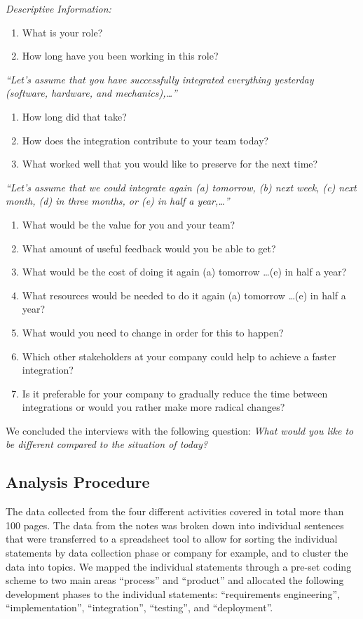 \documentclass[10pt,a4paper]{IEEEtran} %
\begin{document}
\textit{Descriptive Information:}
\begin{enumerate}
\item What is your role?
\item How long have you been working in this role?
\end{enumerate}

\textit{``Let’s assume that you have successfully integrated everything yesterday (software, hardware, and mechanics),\dots''}
\begin{enumerate}
\item How long did that take?
\item How does the integration contribute to your team today?
\item What worked well that you would like to preserve for the next time?
\end{enumerate}

\textit{``Let’s assume that we could integrate again (a) tomorrow, (b) next week, (c) next month, (d) in three months, or (e) in half a year,\dots''}
\begin{enumerate}
\item What would be the value for you and your team?
\item What amount of useful feedback would you be able to get?
\item What would be the cost of doing it again (a) tomorrow \dots (e) in half a year?
\item What resources would be needed to do it again (a) tomorrow \dots (e) in half a year?
\item What would you need to change in order for this to happen?
\item Which other stakeholders at your company could help to achieve a faster integration?
\item Is it preferable for your company to gradually reduce the time between integrations or would you rather make more radical changes?
\end{enumerate}

We concluded the interviews with the following question: \textit{What would you
like to be different compared to the situation of today?}


\subsection{Analysis Procedure}
The data collected from the four different activities covered in total more than 100 pages. The data from the notes was broken down into individual sentences that were transferred to a spreadsheet tool to allow for sorting the
individual statements by data collection phase or company for example, and to cluster the data into topics. We mapped the individual statements through a pre-set coding scheme to two main areas ``process'' and ``product'' and allocated the following development phases to the individual statements: ``requirements engineering'', ``implementation'', ``integration'', ``testing'', and ``deployment''.
\end{document}
